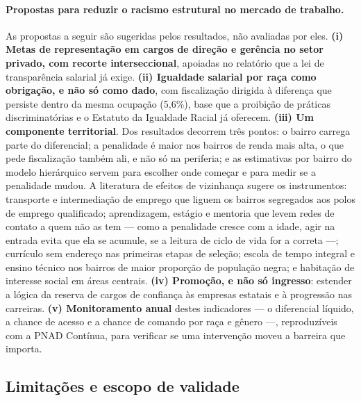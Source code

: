 \documentclass[11pt, a4paper, oneside]{article}
\begin{document}
\paragraph{Propostas para reduzir o racismo estrutural no mercado de trabalho.}
As propostas a seguir são sugeridas pelos resultados, não avaliadas por eles. \textbf{(i) Metas de representação em cargos de direção e gerência no setor privado, com recorte interseccional}, apoiadas no relatório que a lei de transparência salarial já exige. \textbf{(ii) Igualdade salarial por raça como obrigação, e não só como dado}, com fiscalização dirigida à diferença que persiste dentro da mesma ocupação (5,6\%), base que a proibição de práticas discriminatórias \cite{brasil1995lei9029} e o Estatuto da Igualdade Racial \cite{brasil2010lei12288} já oferecem. \textbf{(iii) Um componente territorial}. Dos resultados decorrem três pontos: o bairro carrega parte do diferencial; a penalidade é maior nos bairros de renda mais alta, o que pede fiscalização também ali, e não só na periferia; e as estimativas por bairro do modelo hierárquico servem para escolher onde começar e para medir se a penalidade mudou. A literatura de efeitos de vizinhança \cite{wilson1987, sampson1997, marques2010} sugere os instrumentos: transporte e intermediação de emprego que liguem os bairros segregados aos polos de emprego qualificado; aprendizagem, estágio e mentoria que levem redes de contato a quem não as tem --- como a penalidade cresce com a idade, agir na entrada evita que ela se acumule, se a leitura de ciclo de vida for a correta ---; currículo sem endereço nas primeiras etapas de seleção; escola de tempo integral e ensino técnico nos bairros de maior proporção de população negra; e habitação de interesse social em áreas centrais. \textbf{(iv) Promoção, e não só ingresso}: estender a lógica da reserva de cargos de confiança às empresas estatais e à progressão nas carreiras. \textbf{(v) Monitoramento anual} destes indicadores --- o diferencial líquido, a chance de acesso e a chance de comando por raça e gênero ---, reproduzíveis com a PNAD Contínua, para verificar se uma intervenção moveu a barreira que importa.

\subsection*{Limitações e escopo de validade}
\end{document}
